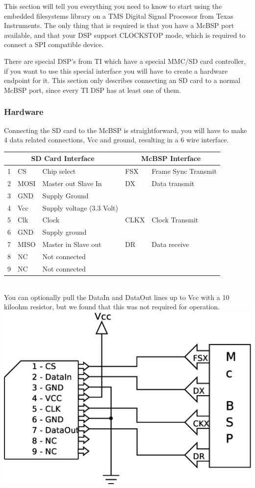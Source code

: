 This section will tell you everything you need to know to start using the
embedded filesystems library on a TMS Digital Signal Processor from Texas Instruments.
The only thing that is required is that you have a McBSP port available, and that your DSP
support CLOCKSTOP mode, which is required to connect a SPI compatible device.

There are special DSP's from TI which have a special MMC/SD card controller, if you want to
use this special interface you will have to create a hardware endpoint for it. This section only
describes connecting an SD card to a normal McBSP port, since every TI DSP has at least one of them.

\subsubsection{Hardware}
Connecting the SD card to the McBSP is straightforward, you will have to make 4 data related
connections, Vcc and ground, resulting in a 6 wire interface.\\
\begin{tabular}{|l|l|l|l|l|}
	\hline
	\multicolumn{3}{|c|}{SD Card Interface}&\multicolumn{2}{|c|}{McBSP Interface}\\
	\hline
	1 & CS & Chip select & FSX & Frame Sync Transmit \\
	2 & MOSI & Master out Slave In & DX & Data transmit \\
	3 & GND & Supply Ground &&\\
	4 & Vcc & Supply voltage (3.3 Volt) &&\\
	5 & Clk & Clock & CLKX & Clock Transmit\\
	6 & GND & Supply ground &&\\
	7 & MISO & Master in Slave out & DR & Data receive \\
	8 & NC & Not connected &&\\
	9 & NC & Not connected &&\\
	\hline
\end{tabular}\\
You can optionally pull the DataIn and DataOut lines up to Vcc with a 10 kiloohm resistor, but
we found that this was not required for operation.\\
\includegraphics[scale=0.4]{schematics/sdcard.eps}\\
